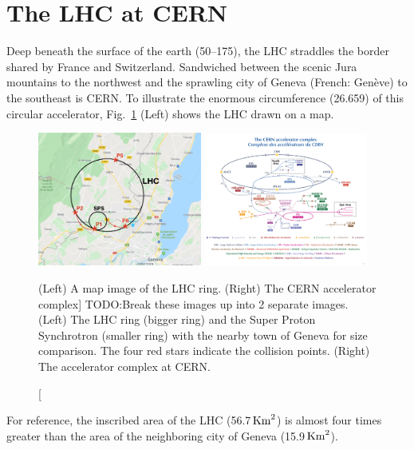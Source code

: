 \section{The LHC at CERN}
Deep beneath the surface of the earth (50--175\meter), the LHC straddles the border shared by France and Switzerland.
Sandwiched between the scenic Jura mountains to the northwest and the sprawling city of Geneva (French: Genève) to the southeast is CERN.
To illustrate the enormous circumference (26.659\Km) of this circular accelerator, Fig.~\ref{fig:lhc_on_map_and_complex} (Left) shows the LHC drawn on a map. %
\begin{figure}[pbth]
    \centering
    \includegraphics[width=0.48\textwidth,keepaspectratio]{figures/lhc/lhc_drawn_on_map_withpoints.png}
    \includegraphics[width=0.48\textwidth,keepaspectratio]{figures/lhc/cern_complex.png}
        \caption
            [(Left) A map image of the LHC ring. (Right) The CERN accelerator complex]
            {TODO:Break these images up into 2 separate images. (Left) The LHC ring (bigger ring) and the Super Proton Synchrotron (smaller ring) with the nearby town of Geneva for size comparison. 
            The four red stars indicate the \pp collision points. 
            (Right) The accelerator complex at CERN.
            } 
        \label{fig:lhc_on_map_and_complex}
    \end{figure}
For reference, the inscribed area of the LHC (56.7$\,\text{Km}^{2}$) is almost four times greater than the area of the neighboring city of Geneva (15.9$\,\text{Km}^{2}$).

